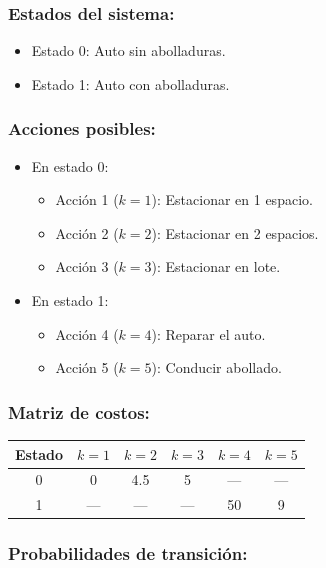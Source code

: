 \documentclass[a4paper,11pt]{article}
\begin{document}
\subsubsection{Estados del sistema:}

\begin{itemize}
    \item Estado 0: Auto sin abolladuras.
    \item Estado 1: Auto con abolladuras.
\end{itemize}

\subsubsection{Acciones posibles:}

\begin{itemize}
    \item En estado 0:
    \begin{itemize}
        \item Acción 1 ($k=1$): Estacionar en 1 espacio.
        \item Acción 2 ($k=2$): Estacionar en 2 espacios.
        \item Acción 3 ($k=3$): Estacionar en lote.
    \end{itemize}
    \item En estado 1:
    \begin{itemize}
        \item Acción 4 ($k=4$): Reparar el auto.
        \item Acción 5 ($k=5$): Conducir abollado.
    \end{itemize}
\end{itemize}

\subsubsection{Matriz de costos:}

\begin{center}
\begin{tabular}{c|ccccc}
\toprule
Estado & $k=1$ & $k=2$ & $k=3$ & $k=4$ & $k=5$ \\
\midrule
0 & 0 & 4.5 & 5 & --- & --- \\
1 & --- & --- & --- & 50 & 9 \\
\bottomrule
\end{tabular}
\end{center}

\subsubsection{Probabilidades de transición:}
\end{document}
